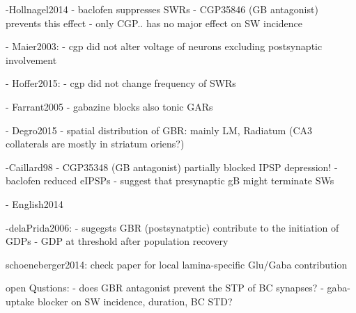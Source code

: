     -Hollnagel2014
      - baclofen suppresses SWRs
      - CGP35846 (GB antagonist) prevents this effect
      - only CGP.. has no major effect on SW incidence


    - Maier2003:
      - cgp did not alter voltage of neurons excluding postsynaptic involvement

    - Hoffer2015:
      - cgp did not change frequency of SWRs


    - Farrant2005
      - gabazine blocks also tonic GARs

    - Degro2015
      - spatial distribution of GBR: mainly LM, Radiatum
      (CA3 collaterals are mostly in striatum oriens?)

    -Caillard98
      - CGP35348 (GB antagonist) partially blocked IPSP depression!
      - baclofen reduced eIPSPs
      - suggest that presynaptic gB might terminate SWs

    - English2014


    -delaPrida2006:
      - sugegsts GBR (postsynatptic) contribute to the initiation of GDPs
      - GDP at threshold after population recovery

    schoeneberger2014: check paper for local lamina-specific Glu/Gaba contribution


  open Qustions:
    - does GBR antagonist prevent the STP of BC synapses?
    - gaba-uptake blocker on SW incidence, duration, BC STD?



